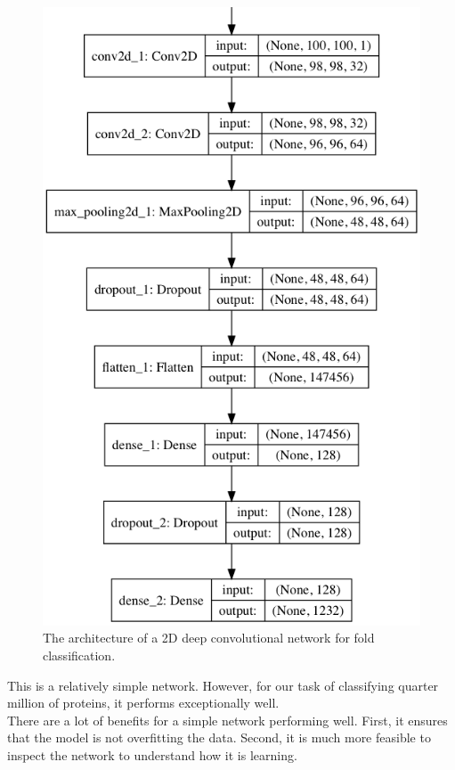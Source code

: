 \documentclass[12pt, a4paper, twocolumn, fullpage]{article}
\theoremstyle{plain}
\theoremstyle{definition}
\theoremstyle{remark}
\begin{document}
\begin{figure}[h]
\includegraphics[width=\linewidth]{model_plot.png}
\caption{The architecture of a 2D deep convolutional network for fold classification.}
\label{fig:network}
\end{figure}

This is a relatively simple network. However, for our task of classifying quarter million of proteins, it performs exceptionally well. 
\\
There are a lot of benefits for a simple network performing well. First, it ensures that the model is not overfitting the data. Second, it is much more feasible to inspect the network to understand how it is learning.
\end{document}
